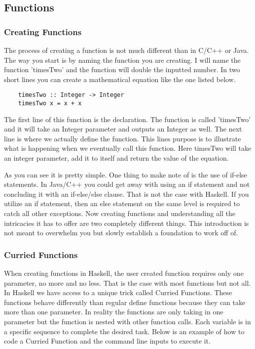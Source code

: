 \documentclass{article}
\begin{document}
\subsection{Functions}
    
    \subsubsection{Creating Functions}
    The process of creating a function is not much different than in C/C++ or Java. The way you start is by naming the function you are creating. I will name the function 'timesTwo' and the function will double the inputted number. In two short lines you can create a mathematical equation like the one listed below. 
    
    \begin{lstlisting}
    timesTwo :: Integer -> Integer
    timesTwo x = x + x 
    \end{lstlisting}
    
    \medskip
    The first line of this function is the declaration. The function is called 'timesTwo' and it will take an Integer parameter and outputs an Integer as well. The next line is where we actually define the function. This lines purpose is to illustrate what is happening when we eventually call this function. Here timesTwo will take an integer parameter, add it to itself and return the value of the equation. 
    
    \medskip
    As you can see it is pretty simple. One thing to make note of is the use of if-else statements. In Java/C++ you could get away with using an if statement and not concluding it with an if-else/else clause. That is not the case with Haskell. If you utilize an if statement, then an else statement on the same level is required to catch all other exceptions. Now creating functions and understanding all the intricacies it has to offer are two completely different things. This introduction is not meant to overwhelm you but slowly establish a foundation to work off of.
    
    \subsubsection{Curried Functions}
    When creating functions in Haskell, the user created function requires only one parameter, no more and no less. That is the case with most functions but not all. In Haskell we have access to a unique trick called Curried Functions. These functions behave differently than regular define functions because they can take more than one parameter. In reality the functions are only taking in one parameter but the function is nested with other function calls. Each variable is in a specific sequence to complete the desired task. Below is an example of how to code a Curried Function and the command line inputs to execute it. 
    \clearpage
    
\end{document}
